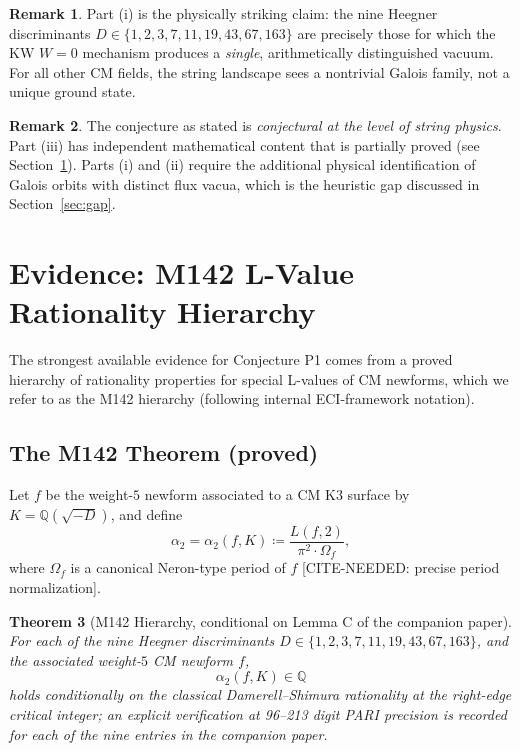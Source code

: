 \documentclass[12pt,a4paper]{article}
\theoremstyle{plain}
\newtheorem{theorem}{Theorem}[section]
\theoremstyle{definition}
\newtheorem{remark}[theorem]{Remark}
\newcommand{\Q}{\mathbb{Q}}
\begin{document}
\begin{remark}
Part (i) is the physically striking claim: the nine Heegner discriminants
$D \in \{1, 2, 3, 7, 11, 19, 43, 67, 163\}$ are precisely those for which
the KW $W=0$ mechanism produces a \emph{single}, arithmetically distinguished
vacuum. For all other CM fields, the string landscape sees a nontrivial
Galois family, not a unique ground state.
\end{remark}

\begin{remark}
The conjecture as stated is \emph{conjectural at the level of string physics}.
Part (iii) has independent mathematical content that is partially proved
(see Section~\ref{sec:evidence}). Parts (i) and (ii) require the additional
physical identification of Galois orbits with distinct flux vacua, which
is the heuristic gap discussed in Section~\ref{sec:gap}.
\end{remark}

\section{Evidence: M142 L-Value Rationality Hierarchy}
\label{sec:evidence}

The strongest available evidence for Conjecture P1 comes from a proved
hierarchy of rationality properties for special L-values of CM newforms,
which we refer to as the M142 hierarchy (following internal ECI-framework
notation).

\subsection{The M142 Theorem (proved)}

Let $f$ be the weight-$5$ newform associated to a CM K3 surface by
$K = \Q(\sqrt{-D})$, and define
\[
  \alpha_2 = \alpha_2(f, K) \coloneqq \frac{L(f, 2)}{\pi^2 \cdot \Omega_f},
\]
where $\Omega_f$ is a canonical Neron-type period of $f$
[CITE-NEEDED: precise period normalization].

\begin{theorem}[M142 Hierarchy, conditional on Lemma C of the companion paper]
\label{thm:M142}
For each of the nine Heegner discriminants $D \in \{1, 2, 3, 7, 11, 19,
43, 67, 163\}$, and the associated weight-$5$ CM newform $f$,
\[
  \alpha_2(f, K) \in \Q
\]
holds conditionally on the classical Damerell--Shimura rationality at
the right-edge critical integer; an explicit verification at 96--213
digit PARI precision is recorded for each of the nine entries in the
companion paper.
\end{theorem}
\end{document}
